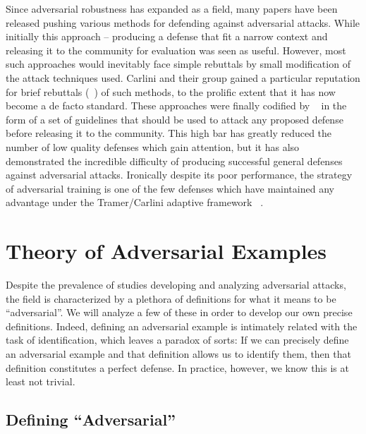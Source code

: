 Since adversarial robustness has expanded as a field, many papers have
been released pushing various methods for defending against
adversarial attacks. While initially this approach -- producing a
defense that fit a narrow context and releasing it to the community
for evaluation was seen as useful. However, most such approaches would
inevitably face simple rebuttals by small modification of the attack
techniques used. Carlini and their group gained a particular
reputation for brief rebuttals (~\cite{carlini_towards_2016, papernot_cleverhans_2016}) of such methods, to the prolific extent
that it has now become a de facto standard. These approaches were
finally codified by ~\cite{tramer2020adaptive} in the form of a set of
guidelines that should be used to attack any proposed defense before
releasing it to the community. This high bar has greatly reduced the
number of low quality defenses which gain attention, but it has also
demonstrated the incredible difficulty of producing successful general
defenses against adversarial attacks. Ironically despite its poor
performance, the strategy of adversarial training is one of the few
defenses which have maintained any advantage under the Tramer/Carlini
adaptive framework ~\cite{adversarial_robustness}. 


\section{Theory of Adversarial Examples}

Despite the prevalence of studies developing and analyzing adversarial
attacks, the field is characterized by a plethora of definitions for
what it means to be ``adversarial''. We will analyze a few of these in
order to develop our own precise definitions. Indeed, defining an
adversarial example is intimately related with the task of
identification, which leaves a paradox of sorts: If we can precisely
define an adversarial example and that definition allows us to
identify them, then that definition constitutes a perfect defense. In
practice, however, we know this is at least not trivial. 

\subsection{Defining ``Adversarial''}

